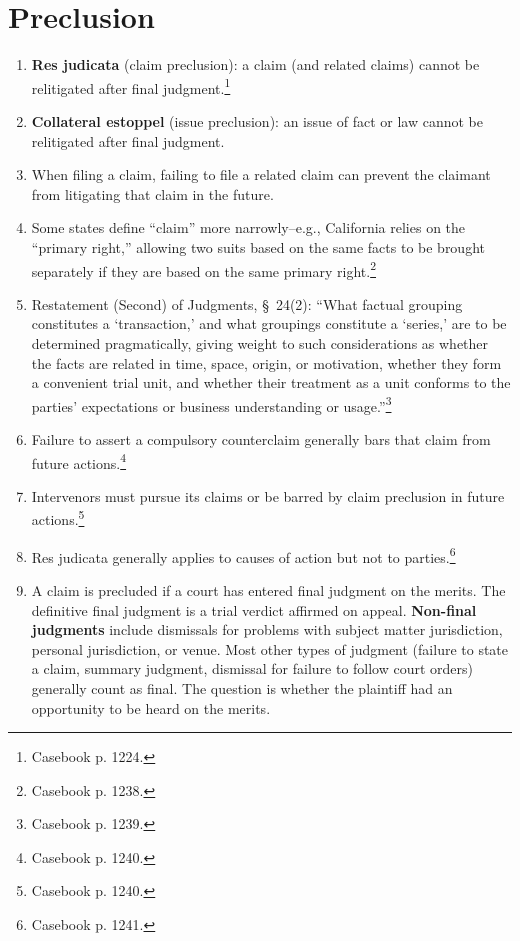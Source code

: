 \section{Preclusion}

\begin{enumerate}
    \item \textbf{Res judicata} (claim preclusion): a claim (and related 
    claims) cannot be relitigated after final judgment.\footnote{Casebook p.  
    1224.}
    \item \textbf{Collateral estoppel} (issue preclusion): an issue of fact or 
    law cannot be relitigated after final judgment.
    \item When filing a claim, failing to file a related claim can prevent the 
    claimant from litigating that claim in the future.
    \item Some states define ``claim'' more narrowly--e.g., California relies 
    on the ``primary right,'' allowing two suits based on the same facts to be 
    brought separately if they are based on the same primary 
    right.\footnote{Casebook p. 1238.}
    \item Restatement (Second) of Judgments, \S\ 24(2): ``What factual 
    grouping constitutes a `transaction,' and what groupings constitute a 
    `series,' are to be determined pragmatically, giving weight to such 
    considerations as whether the facts are related in time, space, origin, or 
    motivation, whether they form a convenient trial unit, and whether their 
    treatment as a unit conforms to the parties' expectations or business 
    understanding or usage.''\footnote{Casebook p. 1239.}
    \item Failure to assert a compulsory counterclaim generally bars that 
    claim from future actions.\footnote{Casebook p. 1240.}
    \item Intervenors must pursue its claims or be barred by claim preclusion 
    in future actions.\footnote{Casebook p. 1240.}
    \item Res judicata generally applies to causes of action but not to 
    parties.\footnote{Casebook p. 1241.}
    \item A claim is precluded if a court has entered final judgment on the 
    merits. The definitive final judgment is a trial verdict affirmed on 
    appeal. \textbf{Non-final judgments} include dismissals for problems with 
    subject matter jurisdiction, personal jurisdiction, or venue. Most other 
    types of judgment (failure to state a claim, summary judgment, dismissal 
    for failure to follow court orders) generally count as final. The question 
    is whether the plaintiff had an opportunity to be heard on the merits.
\end{enumerate}

